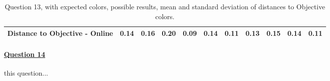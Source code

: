 \begin{table}[H]
{\begin{tabular}{lccccccccccccc}
    \multicolumn{4}{l}{Distance to Objective - Online}                                                                                               & \multicolumn{1}{|c}{0.14}        & \multicolumn{1}{c|}{0.16}    & \multicolumn{1}{|c}{0.20}        & \multicolumn{1}{c|}{0.09}    & \multicolumn{1}{|c}{0.14}       & \multicolumn{1}{c|}{0.11}    & \multicolumn{1}{|c}{\textbf{0.13}}        & \multicolumn{1}{c|}{0.15}    & \multicolumn{1}{|c}{0.14}       & \multicolumn{1}{c|}{0.11}    \\ \hline
    \end{tabular}}
  \caption[Question 13, with expected Results.]{Question 13, with expected colors, possible results, mean and standard deviation of distances to Objective colors.}
  \label{table:lab_q13_expected}
\end{table}
%
\paragraph{\ul{Question 14}}
%
this question...
%
